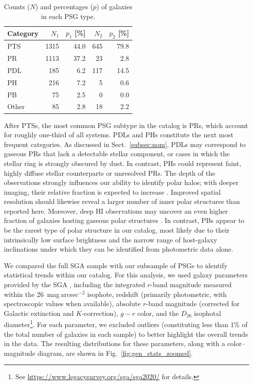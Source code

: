 \documentclass{aa}
\begin{document}
\begin{table}
\centering
\caption{Counts ($N$) and percentages ($p$) of galaxies in each PSG type.}
\label{tab:psg_types}
\begin{tabular}{lrrrr}
\hline
Category & $N_1$ & $p_1$ [\%] & $N_2$ & $p_2$ [\%] \\
\hline
\hline
PTS & 1315 & 44.0 & 645 & 79.8 \\
PR & 1113 & 37.2 & 23 & 2.8 \\
PDL & 185 & 6.2 & 117 & 14.5 \\
PH & 216 & 7.2 & 5 & 0.6 \\
PB & 75 & 2.5 & 0 & 0.0 \\
Other & 85 & 2.8 & 18 & 2.2 \\
\hline
\end{tabular}
\end{table}


After PTSs, the most common PSG subtype in the catalog is PRs, which account for roughly one-third of all systems. PDLs and PHs constitute the next most frequent categories. As discussed in Sect.~\ref{subsec:nom}, PDLs may correspond to gaseous PRs that lack a detectable stellar component, or cases in which the stellar ring is strongly obscured by dust. In contrast, PHs could represent faint, highly diffuse stellar counterparts or unresolved PRs. The depth of the observations strongly influences our ability to identify polar halos; with deeper imaging, their relative fraction is expected to increase \citep{2021MNRAS.506.5030M}. Improved spatial resolution should likewise reveal a larger number of inner polar structures than reported here. Moreover, deep H{\sc I} observations may uncover an even higher fraction of galaxies hosting gaseous polar structures \citep{2023MNRAS.525.4663D}. In contrast, PBs appear to be the rarest type of polar structure in our catalog, most likely due to their intrinsically low surface brightness and the narrow range of host-galaxy inclinations under which they can be identified from photometric data alone.

We compared the full SGA sample with our subsample of PSGs to identify statistical trends within our catalog. For this analysis, we used galaxy parameters provided by the SGA \citep{2023ApJS..269....3M}, including the integrated $r$-band magnitude measured within the 26~mag\,arcsec$^{-2}$ isophote, redshift (primarily photometric, with spectroscopic values when available), absolute $r$-band magnitude (corrected for Galactic extinction and $K$-correction), $g-r$ color, and the $D_{26}$ isophotal diameter\footnote{See \url{https://www.legacysurvey.org/sga/sga2020/} for details.}. For each parameter, we excluded outliers (constituting less than 1\% of the total number of galaxies in each sample) to better highlight the overall trends in the data. The resulting distributions for these parameters, along with a color–magnitude diagram, are shown in Fig.~\ref{fig:gen_stats_zoomed}.
\end{document}
